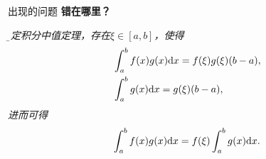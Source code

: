 
\titlepage



\begin{frame}{出现的问题}
	\linespread{1.5}
	{\bf 错在哪里？}
	
	\it\b
	由定积分中值定理，存在$\xi\in[a,b]$，使得
	\begin{align*}
		&\displaystyle\int_a^bf(x)g(x)\mathrm{d} x=f(\xi)g(\xi)(b-a),\\
		&\displaystyle\int_a^bg(x)\mathrm{d} x=g(\xi)(b-a),
	\end{align*}
	进而可得
	$$\displaystyle\int_a^bf(x)g(x)\mathrm{d} x=f(\xi)\displaystyle\int_a^bg(x)\mathrm{d} x.$$
\end{frame}

